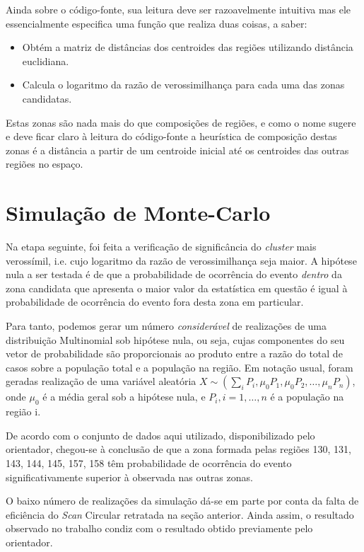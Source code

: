 \documentclass[
	12pt,				%
	openright,			%
	twoside,			%
	a4paper,			%
	english,			%
	brazil,				%
	]{abntex2}
\begin{document}
Ainda sobre o código-fonte, sua leitura deve ser razoavelmente intuitiva mas ele essencialmente especifica uma função que realiza duas coisas, a saber: 

\begin{itemize}
\item Obtém a matriz de distâncias dos centroides das regiões utilizando distância euclidiana.
\item Calcula o logaritmo da razão de verossimilhança para cada uma das zonas candidatas.
\end{itemize}

Estas zonas são nada mais do que composições de regiões, e como o nome sugere e deve ficar claro à leitura do código-fonte a heurística de composição destas zonas é a distância a partir de um centroide inicial até os centroides das outras regiões no espaço.

\newpage
\section{Simulação de Monte-Carlo}
\label{sec:simmc}
Na etapa seguinte, foi feita a verificação de significância do \textit{cluster} mais verossímil, i.e. cujo logaritmo da razão de verossimilhança seja maior. A hipótese nula a ser testada é de que a probabilidade de ocorrência do evento \textit{dentro} da zona candidata que apresenta o maior valor da estatística em questão é igual à probabilidade de ocorrência do evento fora desta zona em particular.

Para tanto, podemos gerar um número \textit{considerável} de realizações de uma distribuição Multinomial sob hipótese nula, ou seja, cujas componentes do seu vetor de probabilidade são proporcionais ao produto entre a razão do total de casos sobre a população total e a população na região. Em notação usual, foram geradas realização de uma variável aleatória $X \sim (\sum_i P_i, \mu_0 P_1, \mu_0 P_2, \dots, \mu_n P_n)$, onde $\mu_0$ é a média geral sob a hipótese nula, e $P_i, i=1,\dots, n$ é a população na região i.

De acordo com o conjunto de dados aqui utilizado, disponibilizado pelo orientador, chegou-se à conclusão de que a zona formada pelas regiões 130, 131, 143, 144, 145, 157, 158 têm probabilidade de ocorrência do evento significativamente superior à observada nas outras zonas. 

O baixo número de realizações da simulação dá-se em parte por conta da falta de eficiência do \textit{Scan} Circular retratada na seção anterior. Ainda assim, o resultado observado no trabalho condiz com o resultado obtido previamente pelo orientador.
\end{document}
